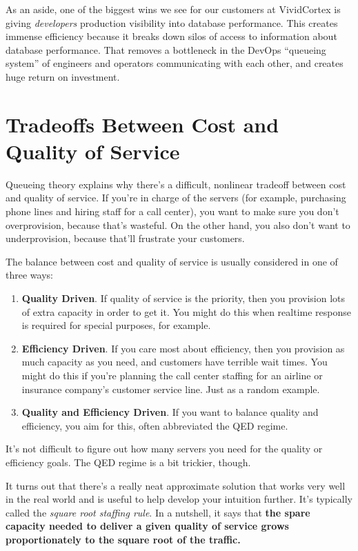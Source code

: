 \documentclass{vivid_layout_pdf}
\begin{document}
As an aside, one of the biggest wins we see for our customers at VividCortex is giving {\itshape developers} production visibility into database performance. This creates immense efficiency because it breaks down silos of access to information about database performance. That removes a bottleneck in the DevOps ``queueing system'' of engineers and operators communicating with each other, and creates huge return on investment.

\section{Tradeoffs Between Cost and Quality of Service}

Queueing theory explains why there's a difficult, nonlinear tradeoff between
cost and quality of service. If you're in charge of the servers (for example,
purchasing phone lines and hiring staff for a call center), you want to make
sure you don't overprovision, because that's wasteful. On the other hand, you
also don't want to underprovision, because that'll frustrate your customers.

The balance between cost and quality of service is usually considered in one of
three ways:

\begin{enumerate}
\item {\bfseries Quality Driven}. If quality of service is the priority, then
you provision lots of extra capacity in order to get it. You might do this when
realtime response is required for special purposes, for example.
\item {\bfseries Efficiency Driven}. If you care most about efficiency, then you
provision as much capacity as you need, and customers have terrible wait times.
You might do this if you're planning the call center staffing for an airline or
insurance company's customer service line. Just as a random example.
\item {\bfseries Quality and Efficiency Driven}. If you want to balance quality
and efficiency, you aim for this, often abbreviated the QED regime.
\end{enumerate}

It's not difficult to figure out how many servers you need for the quality or
efficiency goals. The QED regime is a bit trickier, though.

It turns out that there's a really neat approximate solution that works very
well in the real world and is useful to help develop your intuition further.
It's typically called the {\itshape square root staffing rule}. In a nutshell,
it says that {\bfseries the spare capacity needed to deliver a given quality of
service grows proportionately to the square root of the traffic.}
\end{document}
